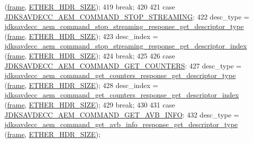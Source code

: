 \begin{DoxyCode}
      (\hyperlink{gst__avb__playbin_8c_ac8e710e0b5e994c0545d75d69868c6f0}{frame}, \hyperlink{namespaceavdecc__lib_a6c827b1a0d973e18119c5e3da518e65ca9512ad9b34302ba7048d88197e0a2dc0}{ETHER\_HDR\_SIZE});
419         \textcolor{keywordflow}{break};
420 
421     \textcolor{keywordflow}{case} \hyperlink{group__command_ga662d8e95498967710f7f3a281987fd6c}{JDKSAVDECC\_AEM\_COMMAND\_STOP\_STREAMING}:
422         desc\_type = 
      \hyperlink{group__command__stop__streaming__response_ga34b89a4a83a1b2095386c25db82b29cd}{jdksavdecc\_aem\_command\_stop\_streaming\_response\_get\_descriptor\_type}
      (\hyperlink{gst__avb__playbin_8c_ac8e710e0b5e994c0545d75d69868c6f0}{frame}, \hyperlink{namespaceavdecc__lib_a6c827b1a0d973e18119c5e3da518e65ca9512ad9b34302ba7048d88197e0a2dc0}{ETHER\_HDR\_SIZE});
423         desc\_index = 
      \hyperlink{group__command__stop__streaming__response_gae809969de67ed8d5343a27f6aeac63a8}{jdksavdecc\_aem\_command\_stop\_streaming\_response\_get\_descriptor\_index}
      (\hyperlink{gst__avb__playbin_8c_ac8e710e0b5e994c0545d75d69868c6f0}{frame}, \hyperlink{namespaceavdecc__lib_a6c827b1a0d973e18119c5e3da518e65ca9512ad9b34302ba7048d88197e0a2dc0}{ETHER\_HDR\_SIZE});
424         \textcolor{keywordflow}{break};
425 
426     \textcolor{keywordflow}{case} \hyperlink{group__command_ga1cce6a5b14c1a00d2491799265ebfeb6}{JDKSAVDECC\_AEM\_COMMAND\_GET\_COUNTERS}:
427         desc\_type = 
      \hyperlink{group__command__get__counters__response_gaeb2014fe7143c09e4d7dd849dde4881f}{jdksavdecc\_aem\_command\_get\_counters\_response\_get\_descriptor\_type}
      (\hyperlink{gst__avb__playbin_8c_ac8e710e0b5e994c0545d75d69868c6f0}{frame}, \hyperlink{namespaceavdecc__lib_a6c827b1a0d973e18119c5e3da518e65ca9512ad9b34302ba7048d88197e0a2dc0}{ETHER\_HDR\_SIZE});
428         desc\_index = 
      \hyperlink{group__command__get__counters__response_gaa74bdfb514c2df95488fd804f59113e5}{jdksavdecc\_aem\_command\_get\_counters\_response\_get\_descriptor\_index}
      (\hyperlink{gst__avb__playbin_8c_ac8e710e0b5e994c0545d75d69868c6f0}{frame}, \hyperlink{namespaceavdecc__lib_a6c827b1a0d973e18119c5e3da518e65ca9512ad9b34302ba7048d88197e0a2dc0}{ETHER\_HDR\_SIZE});
429         \textcolor{keywordflow}{break};
430 
431     \textcolor{keywordflow}{case} \hyperlink{group__command_ga0ef8e645e0859b9d44e25cf1cbd0ce60}{JDKSAVDECC\_AEM\_COMMAND\_GET\_AVB\_INFO}:
432         desc\_type = 
      \hyperlink{group__command__get__avb__info__response_gad2031024e97206470bccff99b206804f}{jdksavdecc\_aem\_command\_get\_avb\_info\_response\_get\_descriptor\_type}
      (\hyperlink{gst__avb__playbin_8c_ac8e710e0b5e994c0545d75d69868c6f0}{frame}, \hyperlink{namespaceavdecc__lib_a6c827b1a0d973e18119c5e3da518e65ca9512ad9b34302ba7048d88197e0a2dc0}{ETHER\_HDR\_SIZE});

\end{DoxyCode}
